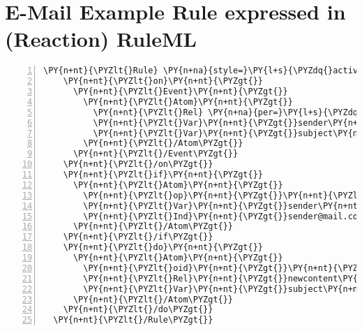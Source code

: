\section{E-Mail Example Rule expressed in (Reaction) RuleML}
\begin{Verbatim}[frame=single,fontsize=\footnotesize,commandchars=\\\{\},numbers=left,firstnumber=1,stepnumber=1,xleftmargin
=.3in]
  \PY{n+nt}{\PYZlt{}Rule} \PY{n+na}{style=}\PY{l+s}{\PYZdq{}active\PYZdq{}}\PY{n+nt}{\PYZgt{}}
    \PY{n+nt}{\PYZlt{}on}\PY{n+nt}{\PYZgt{}}
      \PY{n+nt}{\PYZlt{}Event}\PY{n+nt}{\PYZgt{}}
        \PY{n+nt}{\PYZlt{}Atom}\PY{n+nt}{\PYZgt{}}
          \PY{n+nt}{\PYZlt{}Rel} \PY{n+na}{per=}\PY{l+s}{\PYZdq{}value\PYZdq{}}\PY{n+nt}{\PYZgt{}}mail\PY{n+nt}{\PYZlt{}/Rel\PYZgt{}}
          \PY{n+nt}{\PYZlt{}Var}\PY{n+nt}{\PYZgt{}}sender\PY{n+nt}{\PYZlt{}/Var\PYZgt{}}
          \PY{n+nt}{\PYZlt{}Var}\PY{n+nt}{\PYZgt{}}subject\PY{n+nt}{\PYZlt{}/Var\PYZgt{}}
        \PY{n+nt}{\PYZlt{}/Atom\PYZgt{}}
      \PY{n+nt}{\PYZlt{}/Event\PYZgt{}}
    \PY{n+nt}{\PYZlt{}/on\PYZgt{}}
    \PY{n+nt}{\PYZlt{}if}\PY{n+nt}{\PYZgt{}}
      \PY{n+nt}{\PYZlt{}Atom}\PY{n+nt}{\PYZgt{}}
        \PY{n+nt}{\PYZlt{}op}\PY{n+nt}{\PYZgt{}}\PY{n+nt}{\PYZlt{}Rel}\PY{n+nt}{\PYZgt{}}equals\PY{n+nt}{\PYZlt{}/Rel\PYZgt{}}\PY{n+nt}{\PYZlt{}/op\PYZgt{}}
        \PY{n+nt}{\PYZlt{}Var}\PY{n+nt}{\PYZgt{}}sender\PY{n+nt}{\PYZlt{}/Var\PYZgt{}}
        \PY{n+nt}{\PYZlt{}Ind}\PY{n+nt}{\PYZgt{}}sender@mail.com\PY{n+nt}{\PYZlt{}/Ind\PYZgt{}}
      \PY{n+nt}{\PYZlt{}/Atom\PYZgt{}}
    \PY{n+nt}{\PYZlt{}/if\PYZgt{}}
    \PY{n+nt}{\PYZlt{}do}\PY{n+nt}{\PYZgt{}}
      \PY{n+nt}{\PYZlt{}Atom}\PY{n+nt}{\PYZgt{}}
        \PY{n+nt}{\PYZlt{}oid}\PY{n+nt}{\PYZgt{}}\PY{n+nt}{\PYZlt{}Ind} \PY{n+na}{uri=}\PY{l+s}{\PYZdq{}http://webapi.com\PYZdq{}}\PY{n+nt}{/\PYZgt{}}\PY{n+nt}{\PYZlt{}/oid\PYZgt{}}
        \PY{n+nt}{\PYZlt{}Rel}\PY{n+nt}{\PYZgt{}}newcontent\PY{n+nt}{\PYZlt{}/Rel\PYZgt{}}
        \PY{n+nt}{\PYZlt{}Var}\PY{n+nt}{\PYZgt{}}subject\PY{n+nt}{\PYZlt{}/Var\PYZgt{}} 
      \PY{n+nt}{\PYZlt{}/Atom\PYZgt{}}
    \PY{n+nt}{\PYZlt{}/do\PYZgt{}}
  \PY{n+nt}{\PYZlt{}/Rule\PYZgt{}}
\end{Verbatim}


